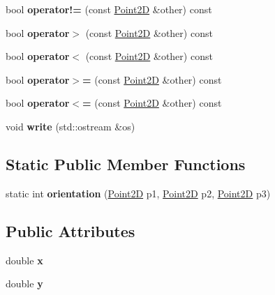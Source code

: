 \begin{DoxyCompactItemize}
\item 
bool {\bfseries operator!=} (const \hyperlink{class_point2_d}{Point2D} \&other) const \hypertarget{class_point2_d_a8995a6dbf3a7acba7a339f5aaed315dc}{}\label{class_point2_d_a8995a6dbf3a7acba7a339f5aaed315dc}

\item 
bool {\bfseries operator$>$} (const \hyperlink{class_point2_d}{Point2D} \&other) const \hypertarget{class_point2_d_a3b928cd162a0d9b61ee07400637ce2ab}{}\label{class_point2_d_a3b928cd162a0d9b61ee07400637ce2ab}

\item 
bool {\bfseries operator$<$} (const \hyperlink{class_point2_d}{Point2D} \&other) const \hypertarget{class_point2_d_addf28be8dabff77bd97793fea6d67d18}{}\label{class_point2_d_addf28be8dabff77bd97793fea6d67d18}

\item 
bool {\bfseries operator$>$=} (const \hyperlink{class_point2_d}{Point2D} \&other) const \hypertarget{class_point2_d_a492423a3ec7d2d58bc19da05d9f98140}{}\label{class_point2_d_a492423a3ec7d2d58bc19da05d9f98140}

\item 
bool {\bfseries operator$<$=} (const \hyperlink{class_point2_d}{Point2D} \&other) const \hypertarget{class_point2_d_aa5e011491191928fbf0540b2d81829d9}{}\label{class_point2_d_aa5e011491191928fbf0540b2d81829d9}

\item 
void {\bfseries write} (std\+::ostream \&os)\hypertarget{class_point2_d_a3e2fbc732482bf9be2ee1ae6a4c37422}{}\label{class_point2_d_a3e2fbc732482bf9be2ee1ae6a4c37422}

\end{DoxyCompactItemize}
\subsection*{Static Public Member Functions}
\begin{DoxyCompactItemize}
\item 
static int {\bfseries orientation} (\hyperlink{class_point2_d}{Point2D} p1, \hyperlink{class_point2_d}{Point2D} p2, \hyperlink{class_point2_d}{Point2D} p3)\hypertarget{class_point2_d_acc4371776a625aa1b92728f288e2b5cf}{}\label{class_point2_d_acc4371776a625aa1b92728f288e2b5cf}

\end{DoxyCompactItemize}
\subsection*{Public Attributes}
\begin{DoxyCompactItemize}
\item 
double {\bfseries x}\hypertarget{class_point2_d_a42fcad8b63853b1136e6207ace6d555e}{}\label{class_point2_d_a42fcad8b63853b1136e6207ace6d555e}

\item 
double {\bfseries y}\hypertarget{class_point2_d_a55747be726950fdcba27c1ad032bfdf1}{}\label{class_point2_d_a55747be726950fdcba27c1ad032bfdf1}

\end{DoxyCompactItemize}
